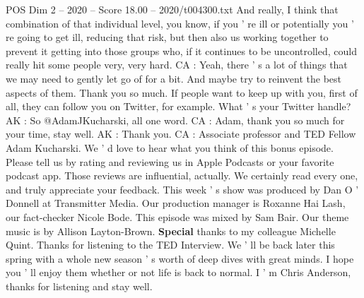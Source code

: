 \begin{textsample}{POS Dim 2 – 2020 – Score 18.00 – 2020/t004300.txt}
And really, I think that combination of that individual level, you know, if you ' re ill or potentially you ' re going to get ill, reducing that risk, but then also us working together to prevent it getting into those groups who, if it continues to be uncontrolled, could really hit some people very, very hard.
CA : Yeah, there ' s a lot of things that we may need to gently let go of for a bit.
And maybe try to reinvent the best aspects of them.
Thank you so much.
If people want to keep up with you, first of all, they can follow you on Twitter, for example.
What ' s your Twitter handle?
AK : So @AdamJKucharski, all one word.
CA : Adam, thank you so much for your time, stay well.
AK : Thank you.
CA : Associate professor and TED Fellow Adam Kucharski.
We ' d love to hear what you think of this bonus episode.
Please tell us by rating and reviewing us in Apple Podcasts or your favorite podcast app.
Those reviews are influential, actually.
We certainly read every one, and truly appreciate your feedback.
This week ' s show was produced by Dan O ' Donnell at Transmitter Media.
Our production manager is Roxanne Hai Lash, our fact-checker Nicole Bode.
This episode was mixed by Sam Bair.
Our theme music is by Allison Layton-Brown. \textbf{Special} thanks to my colleague Michelle Quint.
Thanks for listening to the TED Interview.
We ' ll be back later this spring with a whole new season ' s worth of deep dives with great minds.
I hope you ' ll enjoy them whether or not life is back to normal.
I ' m Chris Anderson, thanks for listening and stay well.

\end{textsample}
